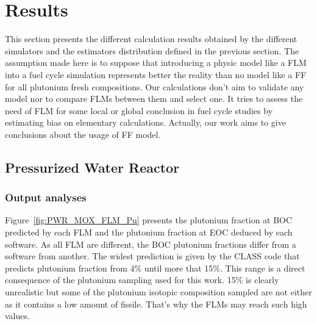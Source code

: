 
\section{Results}

This section presents the different calculation results obtained by the
different simulators and the estimators distribution defined in the previous
section.  The assumption made here is to suppose that introducing a physic model
like a \gls{FLM} into a fuel cycle simulation represents better the reality than
no model like a \gls{FF} for all plutonium fresh compositions. Our calculations
don't aim to validate any model nor to compare \gls{FLM}s between them and
select one. It tries to assess the need of \gls{FLM} for some local or global
conclusion in fuel cycle studies by estimating bias on elementary calculations.
Actually, our work aims to give conclusions about the usage of \gls{FF} model.   

\subsection{Pressurized Water Reactor}
\subsubsection{Output analyses}

Figure~\ref{fig:PWR_MOX_FLM_Pu} presents the plutonium fraction at \gls{BOC} predicted
by each \gls{FLM} and the plutonium fraction at EOC deduced by each software. As all
FLM are different, the \gls{BOC} plutonium fractions differ from a software from
another. The widest prediction is given by the CLASS code that predicts plutonium
fraction from 4\% until more that 15\%. This range is a direct consequence of
the plutonium sampling used for this work. 15\% is clearly unrealistic but some
of the plutonium isotopic composition sampled are not either as it contains a low
amount of fissile. That's why the \gls{FLM}s may reach such high values.    


